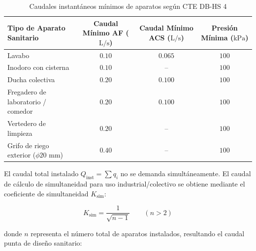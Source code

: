 \documentclass{report}
\begin{document}
\begin{table}[H]

    \centering

    \caption{Caudales instantáneos mínimos de aparatos según CTE DB-HS 4}

    \label{tab:caudales_cte}

    \begin{tabular}{@{}lccc@{}}

        \toprule

        \textbf{Tipo de Aparato Sanitario} & \textbf{Caudal Mínimo AF ($\text{L/s}$)} & \textbf{Caudal Mínimo ACS ($\text{L/s}$)} & \textbf{Presión Mínima ($\text{kPa}$)} \\

        \midrule

        Lavabo & $0.10$ & $0.065$ & $100$ \\

        Inodoro con cisterna & $0.10$ & -- & $100$ \\

        Ducha colectiva & $0.20$ & $0.100$ & $100$ \\

        Fregadero de laboratorio / comedor & $0.20$ & $0.100$ & $100$ \\

        Vertedero de limpieza & $0.20$ & -- & $100$ \\

        Grifo de riego exterior ($\phi 20\text{ mm}$) & $0.40$ & -- & $100$ \\

        \bottomrule

    \end{tabular}

\end{table}



El caudal total instalado $Q_{\text{inst}} = \sum q_i$ no se demanda simultáneamente. El caudal de cálculo de simultaneidad para uso industrial/colectivo se obtiene mediante el coeficiente de simultaneidad $K_{\text{sim}}$:

\begin{equation}

    K_{\text{sim}} = \frac{1}{\sqrt{n - 1}} \qquad (n > 2)

\end{equation}

donde $n$ representa el número total de aparatos instalados, resultando el caudal punta de diseño sanitario:
\end{document}
